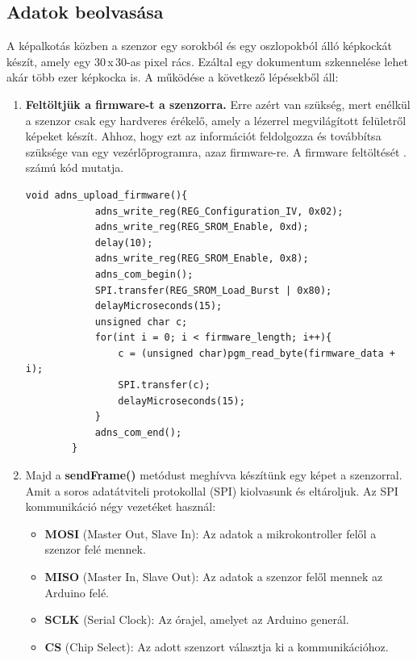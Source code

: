 \documentclass[]{thesis-ekf}
\theoremstyle{definition}
\theoremstyle{remark}
\begin{document}
\subsection{Adatok beolvasása}
A képalkotás közben a szenzor egy sorokból és egy oszlopokból álló képkockát készít, amely egy 30\,x\,30-as pixel rács. Ezáltal egy dokumentum szkennelése lehet akár több ezer képkocka is.
A működése a következő lépésekből áll:
\begin{enumerate}
	\item \textbf{Feltöltjük a firmware-t a szenzorra.} Erre azért van szükség, mert enélkül a szenzor csak egy hardveres érékelő, amely a lézerrel megvilágított felületről képeket készít. Ahhoz, hogy ezt az információt feldolgozza és továbbítsa szüksége van egy vezérlőprogramra, azaz firmware-re. A firmware feltöltését . számú kód mutatja.
	\begin{lstlisting}[language=Arduino,label=upload-firmware-code,caption=Firmware feltöltése]
		void adns_upload_firmware(){
			adns_write_reg(REG_Configuration_IV, 0x02);	
			adns_write_reg(REG_SROM_Enable, 0xd); 
			delay(10); 
			adns_write_reg(REG_SROM_Enable, 0x8); 
			adns_com_begin();
			SPI.transfer(REG_SROM_Load_Burst | 0x80); 
			delayMicroseconds(15);
			unsigned char c;
			for(int i = 0; i < firmware_length; i++){ 
				c = (unsigned char)pgm_read_byte(firmware_data + i);
				SPI.transfer(c);
				delayMicroseconds(15); 
			}
			adns_com_end();
		}
	\end{lstlisting}
	
	\item Majd a \textbf{sendFrame()} metódust meghívva készítünk egy képet a szenzorral. Amit a soros adatátviteli protokollal (SPI) kiolvasunk és eltároljuk. Az SPI kommunikáció négy vezetéket használ: 
	\begin{itemize}
		\item \textbf{MOSI }(Master Out, Slave In): Az adatok a mikrokontroller felől a szenzor felé mennek.
		\item \textbf{MISO }(Master In, Slave Out): Az adatok a szenzor felől mennek az Arduino felé.
		\item \textbf{SCLK }(Serial Clock): Az órajel, amelyet az Arduino generál.
		\item \textbf{CS }(Chip Select): Az adott szenzort választja ki a kommunikációhoz.
	\end{itemize}
	
\end{enumerate}
\end{document}
